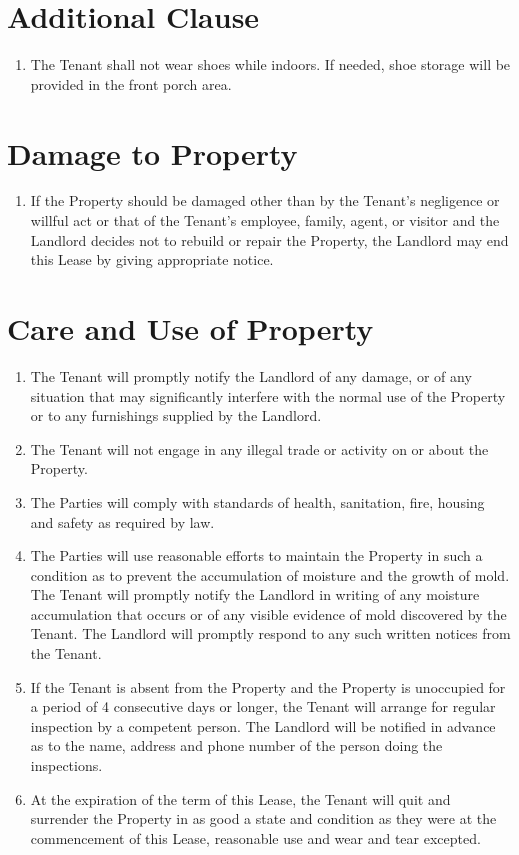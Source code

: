 \documentclass[12pt]{article}
\begin{document}
\section*{Additional Clause}
\begin{enumerate}[resume]
    \item The Tenant shall not wear shoes while indoors. If needed, shoe
	    storage will be provided in the front porch area.
\end{enumerate}
    
\section*{Damage to Property}
\begin{enumerate}[resume]
    \item If the Property should be damaged other than by the Tenant's
	    negligence or willful act or that of the Tenant's employee, family,
		agent, or visitor and the Landlord decides not to rebuild or
		repair the Property, the Landlord may end this Lease by giving
		appropriate notice.
\end{enumerate}
    
\section*{Care and Use of Property}
\begin{enumerate}[resume]
    \item The Tenant will promptly notify the Landlord of any damage, or of any
	    situation that may significantly interfere with the normal use of
		the Property or to any furnishings supplied by the Landlord.
    \item The Tenant will not engage in any illegal trade or activity on or
	    about the Property.
    \item The Parties will comply with standards of health, sanitation, fire,
	    housing and safety as required by law.
    \item The Parties will use reasonable efforts to maintain the Property in
	    such a condition as to prevent the accumulation of moisture and the
		growth of mold. The Tenant will promptly notify the Landlord in
		writing of any moisture accumulation that occurs or of any
		visible evidence of mold discovered by the Tenant. The Landlord
		will promptly respond to any such written notices from the
		Tenant.
    \item If the Tenant is absent from the Property and the Property is
	    unoccupied for a period of 4 consecutive days or longer, the Tenant
		will arrange for regular inspection by a competent person. The
		Landlord will be notified in advance as to the name, address
		and phone number of the person doing the inspections.
    \item At the expiration of the term of this Lease, the Tenant will quit and
	    surrender the Property in as good a state and condition as they
		were at the commencement of this Lease, reasonable use and wear
		and tear excepted.
\end{enumerate}
    
\end{document}

